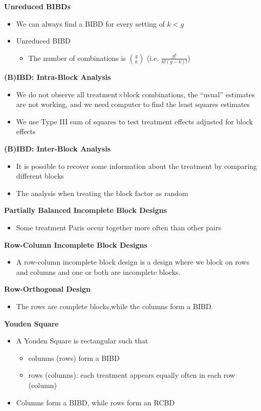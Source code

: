 \documentclass[a4paper]{article}
\begin{document}
\textbf{Unreduced BIBDs}
\begin{itemize}
    \item We can always find a BIBD for every setting of $k<g$
    \item Unreduced BIBD
    \begin{itemize}
        \item The number of combinations is $\binom{g}{k}$ (i.e. $\frac{g!}{k!(g-k)!}$)
    \end{itemize}
\end{itemize}
\textbf{(B)IBD: Intra-Block Analysis}
\begin{itemize}
    \item We do not observe all treatment$\times$block combinations, the ``usual'' estimates are not working, and we need computer to find the least squares estimates
    \item We use Type III sum of squares to test treatment effects adjusted for block effects
\end{itemize}

\textbf{(B)IBD: Inter-Block Analysis}
\begin{itemize}
    \item It is possible to recover some information about the treatment by comparing different blocks
    \item The analysis when treating the block factor as random
\end{itemize}

\textbf{Partially Balanced Incomplete Block Designs}
\begin{itemize}
    \item Some treatment Paris occur together more often than other pairs
\end{itemize}

\textbf{Row-Column Incomplete Block Designs}
\begin{itemize}
    \item A row-column incomplete block design is a design where we block on rows and columns and one or both are incomplete blocks.
\end{itemize}

\textbf{Row-Orthogonal Design}
\begin{itemize}
    \item The rows are complete blocks,while the columns form a BIBD.
\end{itemize}

\textbf{Youden Square}
\begin{itemize}
    \item A Youden Square is rectangular such that
    \begin{itemize}
        \item columns (rows) form a BIBD
        \item rows (columns): each treatment appears equally often in each row (column)
    \end{itemize}
    \item Columns form a BIBD, while rows form an RCBD
\end{itemize}
\end{document}
